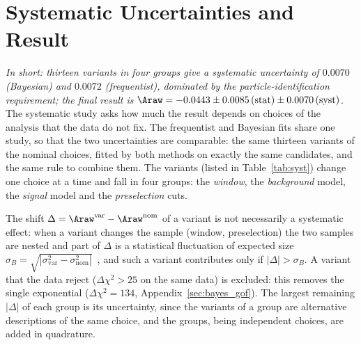 \section{Systematic Uncertainties and Result}
\label{sec:syst}
\emph{In short: thirteen variants in four groups give a systematic uncertainty of $0.0070$ (Bayesian) and $0.0072$ (frequentist), dominated by the particle-identification requirement; the final result is $\Araw=-0.0443\pm0.0085\,(\text{stat})\pm0.0070\,(\text{syst})$.}
The systematic study asks how much the result depends on choices of the analysis that the data do not fix. The frequentist and Bayesian fits share one study, so that the two uncertainties are comparable: the same thirteen variants of the nominal choices, fitted by both methods on exactly the same candidates, and the same rule to combine them. The variants (listed in Table~\ref{tab:syst}) change one choice at a time and fall in four groups: the \emph{window}, the \emph{background} model, the \emph{signal} model and the \emph{preselection} cuts.

The shift $\Delta=\Araw^{\mathrm{var}}-\Araw^{\mathrm{nom}}$ of a variant is not necessarily a systematic effect: when a variant changes the sample (window, preselection) the two samples are nested and part of $\Delta$ is a statistical fluctuation of expected size $\sigma_B=\sqrt{|\sigma_{\mathrm{var}}^2-\sigma_{\mathrm{nom}}^2|}$~\cite{barlow}, and such a variant contributes only if $|\Delta|>\sigma_B$. A variant that the data reject ($\Delta\chi^2>25$ on the same data) is excluded: this removes the single exponential ($\Delta\chi^2=134$, Appendix~\ref{sec:bayes_gof}). The largest remaining $|\Delta|$ of each group is its uncertainty, since the variants of a group are alternative descriptions of the same choice, and the groups, being independent choices, are added in quadrature.

